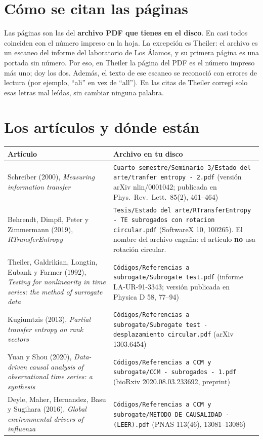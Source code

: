 \documentclass[11pt,openany]{book}
\newcommand{\archivo}[1]{\texttt{\small #1}}
\begin{document}
\section*{Cómo se citan las páginas}

Las páginas son las del \textbf{archivo PDF que tienes en el disco}. En casi todos coinciden con el número impreso en la hoja. La excepción es Theiler: el archivo es un escaneo del informe del laboratorio de Los Álamos, y su primera página es una portada sin número. Por eso, en Theiler la página del PDF es el número impreso más uno; doy los dos. Además, el texto de ese escaneo se reconoció con errores de lectura (por ejemplo, ``ali'' en vez de ``all''). En las citas de Theiler corregí solo esas letras mal leídas, sin cambiar ninguna palabra.

\section*{Los artículos y dónde están}

\begin{center}\small
\begin{tabular}{>{\raggedright}p{4.2cm}>{\raggedright\arraybackslash}p{10.6cm}}
\toprule
Artículo & Archivo en tu disco \\
\midrule
Schreiber (2000), \emph{Measuring information transfer} & \archivo{Cuarto semestre/Seminario 3/Estado del arte/tranfer entropy - 2.pdf} (versión arXiv nlin/0001042; publicada en Phys.\ Rev.\ Lett.\ 85(2), 461--464) \\
Behrendt, Dimpfl, Peter y Zimmermann (2019), \emph{RTransferEntropy} & \archivo{Tesis/Estado del arte/RTransferEntropy - TE subrogados con rotacion circular.pdf} (SoftwareX 10, 100265). El nombre del archivo engaña: el artículo \textbf{no} usa rotación circular. \\
Theiler, Galdrikian, Longtin, Eubank y Farmer (1992), \emph{Testing for nonlinearity in time series: the method of surrogate data} & \archivo{Códigos/Referencias a subrogate/Subrogate test.pdf} (informe LA-UR-91-3343; versión publicada en Physica D 58, 77--94) \\
Kugiumtzis (2013), \emph{Partial transfer entropy on rank vectors} & \archivo{Códigos/Referencias a subrogate/Subrogate test - desplazamiento circular.pdf} (arXiv 1303.6454) \\
Yuan y Shou (2020), \emph{Data-driven causal analysis of observational time series: a synthesis} & \archivo{Códigos/Referencias a CCM y subrogate/CCM - subrogados - 1.pdf} (bioRxiv 2020.08.03.233692, preprint) \\
Deyle, Maher, Hernandez, Basu y Sugihara (2016), \emph{Global environmental drivers of influenza} & \archivo{Códigos/Referencias a CCM y subrogate/METODO DE CAUSALIDAD - (LEER).pdf} (PNAS 113(46), 13081--13086) \\
\bottomrule
\end{tabular}
\end{center}
\end{document}
